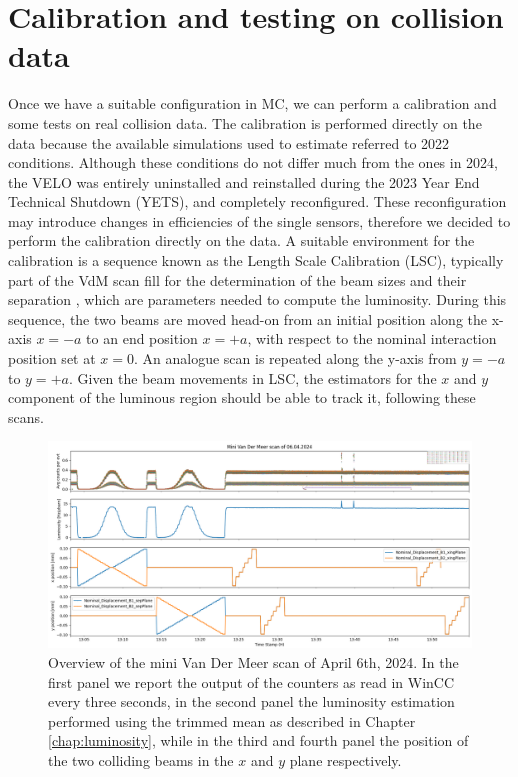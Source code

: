 \section{Calibration and testing on collision data}
Once we have a suitable configuration in MC, we can perform a calibration and some tests on real collision data. The calibration is performed directly on the data because the available simulations used to estimate referred to 2022 conditions. Although these conditions do not differ much from the ones in 2024, the VELO was entirely uninstalled and reinstalled during the 2023 Year End Technical Shutdown (YETS), and completely reconfigured. These reconfiguration may introduce changes in efficiencies of the single sensors, therefore we decided to perform the calibration directly on the data. A suitable environment for the calibration is a sequence known as the Length Scale Calibration (LSC), typically part of the VdM scan fill for the determination of the beam sizes and their separation \cite{Balagura_2021}, which are parameters needed to compute the luminosity. During this sequence, the two beams are moved head-on from an initial position along the x-axis $x = -a$ to an end position $x = +a$, with respect to the nominal interaction position set at $x=0$. An analogue scan is repeated along the y-axis from $y=-a$ to $y=+a$. 
Given the beam movements in LSC, the estimators for the $x$ and $y$ component of the luminous region should be able to track it, following these scans.

\begin{figure}
    \centering
    \includegraphics[width=\textwidth]{figures/lumi_with_counters.png}
    \caption{Overview of the mini Van Der Meer scan of April 6th, 2024. In the first panel we report the output of the counters as read in WinCC every three seconds, in the second panel the luminosity estimation performed using the trimmed mean as described in Chapter \ref{chap:luminosity}, while in the third and fourth panel the position of the two colliding beams in the $x$ and $y$ plane respectively.}
    \label{fig:mini-vdm}
\end{figure}

